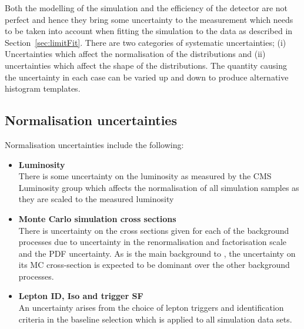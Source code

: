 Both the modelling of the simulation and the efficiency of the detector are not perfect and hence they bring some uncertainty to the measurement which needs to be taken into account when fitting the simulation to the data as described in Section~\ref{sec:limitFit}.
There are two categories of systematic uncertainties; (i) Uncertainties which affect the normalisation of the distributions and (ii) uncertainties which affect the shape of the distributions. The quantity causing the uncertainty in each case can be varied up and down to produce alternative histogram templates.

\subsection{Normalisation uncertainties}
Normalisation uncertainties include the following:
\begin{itemize}
\item \textbf{Luminosity}\\
There is some uncertainty on the luminosity as measured by the CMS Luminosity group which affects the normalisation of all simulation samples as they are scaled to the measured luminosity

\item \textbf{Monte Carlo simulation cross sections}\\
There is uncertainty on the cross sections given for each of the background processes due to uncertainty in the renormalisation and factorisation scale and the PDF uncertainty. As \ttbar is the main background to \tttt, the uncertainty on its MC cross-section is expected to be dominant over the other background processes. 

\item \textbf{Lepton ID, Iso and trigger SF}\\
An uncertainty arises from the choice of lepton triggers and identification criteria in the baseline selection which is applied to all simulation data sets.


\end{itemize}

